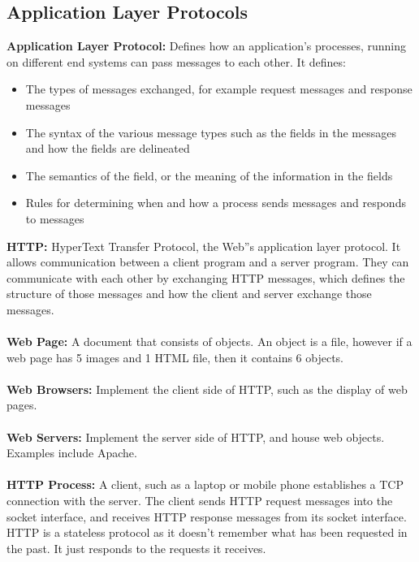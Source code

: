 \documentclass[]{article}
\begin{document}
\subsection{Application Layer Protocols}
\textcolor{Emerald}{\textbf{Application Layer Protocol:}} Defines how an application's processes, running on different end systems can pass messages to each other. It defines:
\renewcommand{\labelitemi}{\textperiodcentered}
\begin{itemize}
	\item The types of messages exchanged, for example request messages and response messages 
	\item The syntax of the various message types such as the fields in the messages and how the fields are delineated 
	\item The semantics of the field, or the meaning of the information in the fields 
	\item Rules for determining when and how a process sends messages and responds to messages 
\end{itemize}
\textcolor{Emerald}{\textbf{HTTP:}} HyperText Transfer Protocol, the Web''s application layer protocol. It allows communication between a client program and a server program. They can communicate with each other by exchanging HTTP messages, which defines the structure of those messages and how the client and server exchange those messages. \\\\
\textcolor{Emerald}{\textbf{Web Page:}} A document that consists of objects. An object is a file, however if a web page has 5 images and 1 HTML file, then it contains 6 objects. \\\\
\textcolor{Emerald}{\textbf{Web Browsers:}} Implement the client side of HTTP, such as the display of web pages. \\\\
\textcolor{Emerald}{\textbf{Web Servers:}} Implement the server side of HTTP, and house web objects. Examples include Apache. \\\\
\textcolor{Emerald}{\textbf{HTTP Process:}} A client, such as a laptop or mobile phone establishes a TCP connection with the server. The client sends HTTP request messages into the socket interface, and receives HTTP response messages from its socket interface. HTTP is a stateless protocol as it doesn't remember what has been requested in the past. It just responds to the requests it receives. \\\\
\end{document}
